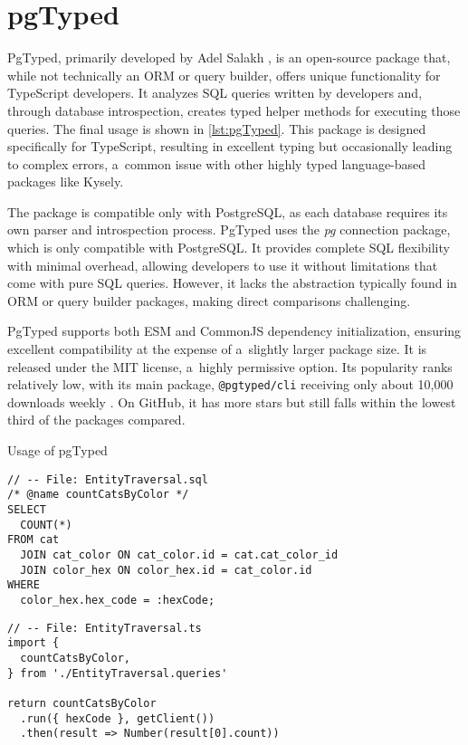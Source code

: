 \section{pgTyped}
PgTyped, primarily developed by Adel Salakh \cite{pgTyped}, is an open-source
package that, while not technically an ORM or query builder, offers unique
functionality for TypeScript developers. It analyzes SQL queries written by
developers and, through database introspection, creates typed helper methods for
executing those queries. The final usage is shown in \autoref{lst:pgTyped}. This
package is designed specifically for TypeScript, resulting in excellent typing
but occasionally leading to complex errors, a~common issue with other highly
typed language-based packages like Kysely.

The package is compatible only with PostgreSQL, as each database requires its
own parser and introspection process. PgTyped uses the \textit{pg} connection package,
which is only compatible with PostgreSQL. It provides complete SQL flexibility
with minimal overhead, allowing developers to use it without limitations that
come with pure SQL queries. However, it lacks the abstraction typically found in
ORM or query builder packages, making direct comparisons challenging.

PgTyped supports both ESM and CommonJS dependency initialization, ensuring
excellent compatibility at the expense of a~slightly larger package size. It is
released under the MIT license, a~highly permissive option. Its popularity ranks
relatively low, with its main package, \texttt{@pgtyped/cli} receiving only
about 10,000 downloads weekly \cite{pgtyped/cli}. On GitHub, it has more stars
but still falls within the lowest third of the packages compared.

\begin{listing}[ht]
  \caption{Usage of pgTyped}
  \label{lst:pgTyped}
  \begin{verbatim}
// -- File: EntityTraversal.sql
/* @name countCatsByColor */
SELECT
  COUNT(*)
FROM cat
  JOIN cat_color ON cat_color.id = cat.cat_color_id
  JOIN color_hex ON color_hex.id = cat_color.id
WHERE
  color_hex.hex_code = :hexCode;
\end{verbatim}  
\vspace{-\medskipamount}
\vspace{-0.5\baselineskip}
\vspace{0.8pt}%

\begin{verbatim}
// -- File: EntityTraversal.ts 
import {
  countCatsByColor,
} from './EntityTraversal.queries'

return countCatsByColor
  .run({ hexCode }, getClient())
  .then(result => Number(result[0].count))
  
  \end{verbatim}
\end{listing}

